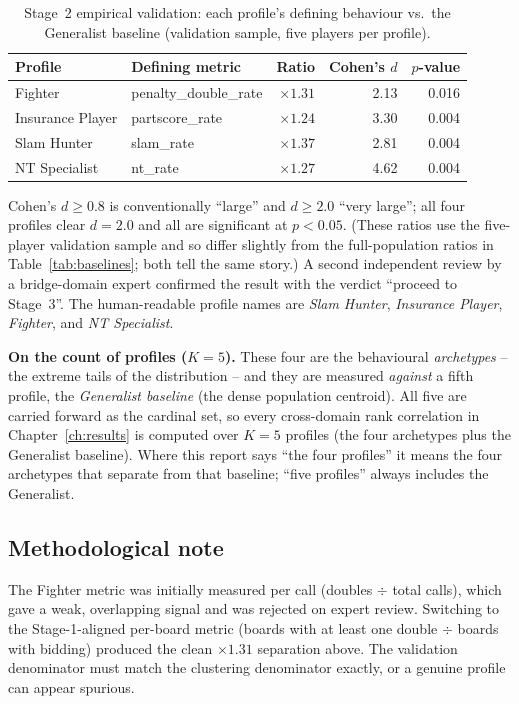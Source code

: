 \documentclass[11pt, a4paper, oneside, openany]{report}
\begin{document}
\begin{table}[H]
\centering
\caption{Stage~2 empirical validation: each profile's defining behaviour vs.\
the Generalist baseline (validation sample, five players per profile).}
\label{tab:stage2validation}
\begin{tabular}{llrrr}
\toprule
\textbf{Profile} & \textbf{Defining metric} & \textbf{Ratio} & \textbf{Cohen's $d$} & \textbf{$p$-value} \\
\midrule
Fighter          & penalty\_double\_rate & $\times1.31$ & 2.13 & 0.016 \\
Insurance Player & partscore\_rate       & $\times1.24$ & 3.30 & 0.004 \\
Slam Hunter      & slam\_rate            & $\times1.37$ & 2.81 & 0.004 \\
NT Specialist    & nt\_rate              & $\times1.27$ & 4.62 & 0.004 \\
\bottomrule
\end{tabular}
\end{table}

Cohen's $d \ge 0.8$ is conventionally ``large'' and $d \ge 2.0$ ``very large'';
all four profiles clear $d = 2.0$ and all are significant at $p < 0.05$. (These
ratios use the five-player validation sample and so differ slightly from the
full-population ratios in Table~\ref{tab:baselines}; both tell the same story.) A
second independent review by a bridge-domain expert confirmed the result with
the verdict ``proceed to Stage~3''. The human-readable profile names are
\emph{Slam Hunter}, \emph{Insurance Player}, \emph{Fighter}, and
\emph{NT Specialist}.

\textbf{On the count of profiles ($K=5$).} These four are the behavioural
\emph{archetypes} -- the extreme tails of the distribution -- and they are
measured \emph{against} a fifth profile, the \emph{Generalist baseline} (the
dense population centroid). All five are carried forward as the cardinal set,
so every cross-domain rank correlation in Chapter~\ref{ch:results} is computed
over $K=5$ profiles (the four archetypes plus the Generalist baseline). Where
this report says ``the four profiles'' it means the four archetypes that
separate from that baseline; ``five profiles'' always includes the Generalist.

\subsection*{Methodological note}
The Fighter metric was initially measured per call (doubles $\div$ total calls),
which gave a weak, overlapping signal and was rejected on expert review.
Switching to the Stage-1-aligned per-board metric (boards with at least one
double $\div$ boards with bidding) produced the clean $\times1.31$ separation
above. The validation denominator must match the clustering denominator
exactly, or a genuine profile can appear spurious.
\end{document}
